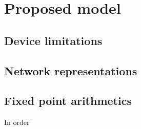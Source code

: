 \FloatBarrier
\chapter{Proposed model}

\FloatBarrier
\section{Device limitations}

\FloatBarrier
\section{Network representations}

\FloatBarrier
\section{Fixed point arithmetics}
In order
